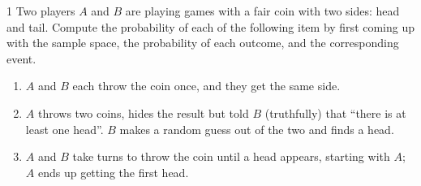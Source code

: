 \documentclass[12pt]{article}
\begin{document}


\begin{problem}{1}
    Two players $A$ and $B$ are playing games with a fair coin with two sides: head and tail. Compute the probability of each of the following item by first coming up with the sample space, the probability of each outcome, and the corresponding event.
    \begin{enumerate}
        \item $A$ and $B$ each throw the coin once, and they get the same side. 
        \item $A$ throws two coins, hides the result but told $B$ (truthfully) that “there is at least one head”. $B$ makes a random guess out of the two and finds a head.
        \item $A$ and $B$ take turns to throw the coin until a head appears, starting with $A$; $A$ ends up getting the first head.
    \end{enumerate}
\end{problem}
\end{document}
